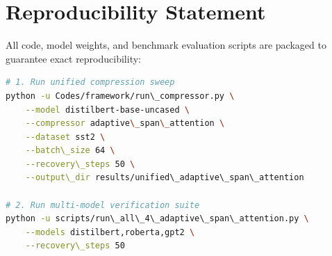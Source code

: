 \section{Reproducibility Statement}
All code, model weights, and benchmark evaluation scripts are packaged to guarantee exact reproducibility:
\begin{lstlisting}[language=bash]
# 1. Run unified compression sweep
python -u Codes/framework/run\_compressor.py \
    --model distilbert-base-uncased \
    --compressor adaptive\_span\_attention \
    --dataset sst2 \
    --batch\_size 64 \
    --recovery\_steps 50 \
    --output\_dir results/unified\_adaptive\_span\_attention

# 2. Run multi-model verification suite
python -u scripts/run\_all\_4\_adaptive\_span\_attention.py \
    --models distilbert,roberta,gpt2 \
    --recovery\_steps 50
\end{lstlisting}
